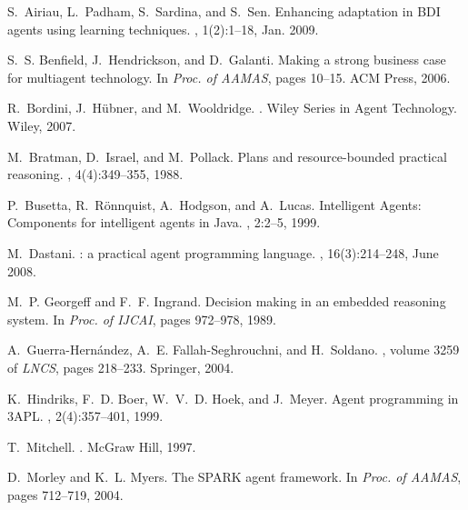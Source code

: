 \documentclass{aamas2010}
\begin{document}
\begin{thebibliography}{10}

S.~Airiau, L.~Padham, S.~Sardina, and S.~Sen.
\newblock Enhancing adaptation in {BDI} agents using learning techniques.
, 1(2):1--18, Jan. 2009.

S.~S. Benfield, J.~Hendrickson, and D.~Galanti.
\newblock Making a strong business case for multiagent technology.
\newblock In {\em Proc. of AAMAS}, pages 10--15. ACM Press, 2006.

R.~Bordini, J.~H{\"u}bner, and M.~Wooldridge.
.
\newblock Wiley Series in Agent Technology. Wiley, 2007.

M.~Bratman, D.~Israel, and M.~Pollack.
\newblock Plans and resource-bounded practical reasoning.
, 4(4):349--355, 1988.

P.~Busetta, R.~R{\"o}nnquist, A.~Hodgson, and A.~Lucas.
 {I}ntelligent {A}gents: {C}omponents for intelligent agents in
  {J}ava.
, 2:2--5, 1999.

M.~Dastani.
: a practical agent programming language.
, 16(3):214--248, June
  2008.

M.~P. Georgeff and F.~F. Ingrand.
\newblock Decision making in an embedded reasoning system.
\newblock In {\em Proc. of IJCAI}, pages 972--978, 1989.

A.~Guerra-Hern\'andez, A.~E. Fallah-Seghrouchni, and H.~Soldano.
, volume 3259 of {\em
  LNCS}, pages 218--233.
\newblock Springer, 2004.

K.~Hindriks, F.~D. Boer, W.~V.~D. Hoek, and J.~Meyer.
\newblock Agent programming in {3APL}.
, 2(4):357--401, 1999.

T.~Mitchell.
.
\newblock McGraw Hill, 1997.

D.~Morley and K.~L. Myers.
\newblock The {SPARK} agent framework.
\newblock In {\em Proc. of AAMAS}, pages 712--719, 2004.


\end{thebibliography}
\end{document}
